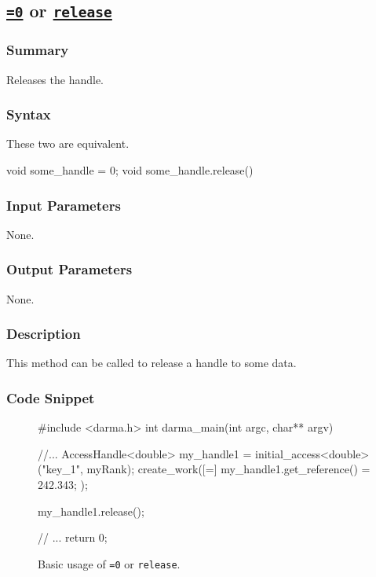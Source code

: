 \clearpage
\subsection{\underline{\texttt{=0}} or \underline{\texttt{release}}}

\hspace{0.1cm} %
\begin{subs}
\vspace{-1.2cm}

\subsubsection{Summary} 
Releases the handle.

\subsubsection{Syntax} 
These two are equivalent.
\begin{CppCode}
void some_handle = 0;    
void some_handle.release()
\end{CppCode}


\subsubsection{Input Parameters} 
None.

\subsubsection{Output Parameters} 
None.

\subsubsection{Description} 
This method can be called to release a handle to some data.


\subsubsection{Code Snippet} 
\begin{figure}[!h]
\begin{CppCodeNumb}
#include <darma.h>
int darma_main(int argc, char** argv)
{
	//...
  AccessHandle<double> my_handle1 = initial_access<double>("key_1", myRank);
  create_work([=]{
  	my_handle1.get_reference() = 242.343;
  });

  my_handle1.release();

  // ... 
  return 0;
}
\end{CppCodeNumb}
\label{fig:fe_api_initialaccess}
\caption{Basic usage of \texttt{=0} or \texttt{release}.}
\end{figure}

\end{subs}





